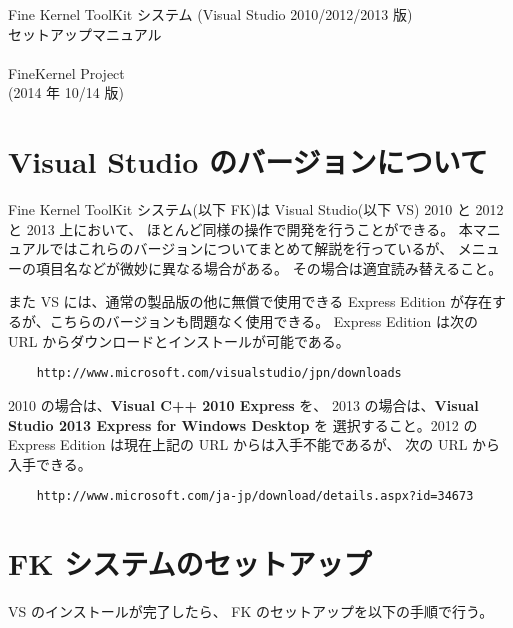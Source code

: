 \documentclass[a4j]{jarticle}
\begin{document}
\begin{center}
{\Large Fine Kernel ToolKit システム (Visual Studio 2010/2012/2013 版) \\
	セットアップマニュアル} \\ ~ \\
{\Large FineKernel Project} \\
(2014 年 10/14 版)
\end{center}


\section{Visual Studio のバージョンについて}
Fine Kernel ToolKit システム(以下 FK)は 
Visual Studio(以下 VS) 2010 と 2012 と 2013 上において、
ほとんど同様の操作で開発を行うことができる。
本マニュアルではこれらのバージョンについてまとめて解説を行っているが、
メニューの項目名などが微妙に異なる場合がある。
その場合は適宜読み替えること。

また VS には、通常の製品版の他に無償で使用できる 
Express Edition が存在するが、こちらのバージョンも問題なく使用できる。
Express Edition は次の URL からダウンロードとインストールが可能である。

\begin{verbatim}
    http://www.microsoft.com/visualstudio/jpn/downloads
\end{verbatim}

2010 の場合は、{\bf Visual C++ 2010 Express} を、
2013 の場合は、{\bf Visual Studio 2013 Express for Windows Desktop} を
選択すること。2012 の Express Edition は現在上記の URL からは入手不能であるが、
次の URL から入手できる。

\begin{verbatim}
    http://www.microsoft.com/ja-jp/download/details.aspx?id=34673
\end{verbatim}

\section{FK システムのセットアップ}
VS のインストールが完了したら、
FK のセットアップを以下の手順で行う。
\end{document}
